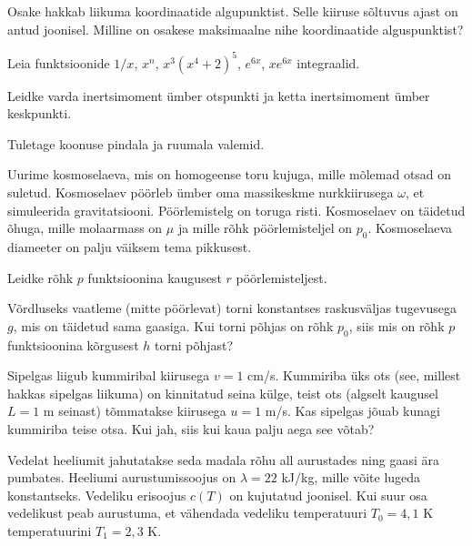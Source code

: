 \documentclass[a4paper,11pt,twocolumn]{article}
\begin{document}
\begin{question}[NBPhO 2016, P7][mat3][8cm]
	Osake hakkab liikuma koordinaatide algupunktist. Selle kiiruse sõltuvus ajast on antud joonisel. Milline on osakese maksimaalne nihe koordinaatide alguspunktist?
\end{question}
\begin{question}
	Leia funktsioonide \( 1/x \), \( x^n \), \( x^3(x^4+2)^5 \), \( e^{6x} \), \( xe^{6x} \) integraalid. 
\end{question}
\begin{question}
	Leidke varda inertsimoment ümber otspunkti ja ketta inertsimoment ümber keskpunkti.
\end{question}
\begin{question}
	Tuletage koonuse pindala ja ruumala valemid.
\end{question}
\begin{question}[NBPhO 2017, P9]
	Uurime kosmoselaeva, mis on homogeense toru kujuga, mille mõlemad otsad on suletud. Kosmoselaev pöörleb ümber oma massikeskme nurkkiirusega \( \omega \), et simuleerida gravitatsiooni. Pöörlemistelg on toruga risti. Kosmoselaev on täidetud õhuga, mille molaarmass on \( \mu \) ja mille rõhk pöörlemisteljel on \( p_0 \). Kosmoselaeva diameeter on palju väiksem tema pikkusest.
	\begin{subquestion}
		\item Leidke rõhk \( p \) funktsioonina kaugusest \( r \) pöörlemisteljest.
		\item Võrdluseks vaatleme (mitte pöörlevat) torni konstantses raskusväljas tugevusega \( g \), mis on täidetud sama gaasiga. Kui torni põhjas on rõhk \( p_0 \), siis mis on rõhk \( p \) funktsioonina kõrgusest \( h \) torni põhjast?
	\end{subquestion}
\end{question}
\begin{question}
	Sipelgas liigub kummiribal kiirusega \( v=1 \) cm/s. Kummiriba üks ots (see, millest hakkas sipelgas liikuma) on kinnitatud seina külge, teist ots (algselt kaugusel \( L=1 \) m seinast) tõmmatakse kiirusega \( u=1 \) m/s. Kas sipelgas jõuab kunagi kummiriba teise otsa. Kui jah, siis kui kaua palju aega see võtab?
\end{question}
\begin{question}[NBPhO 2016, P7][mat2][\columnwidth]
	Vedelat heeliumit jahutatakse seda madala rõhu all aurustades ning gaasi ära pumbates. Heeliumi aurustumissoojus on \( λ = 22 \) kJ/kg, mille võite lugeda konstantseks. Vedeliku erisoojus \( c(T) \) on kujutatud joonisel. Kui suur osa vedelikust peab aurustuma, et vähendada vedeliku temperatuuri \( T_0 = 4,1 \) K temperatuurini \( T_1 = 2,3 \) K.
\end{question}
\end{document}

